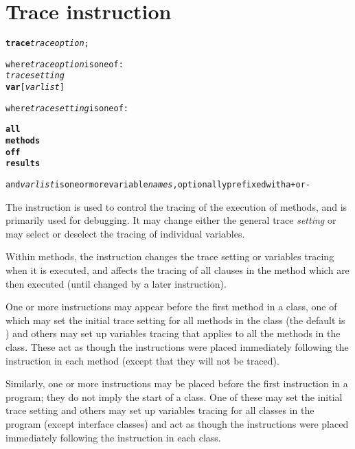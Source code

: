 \chapter{Trace instruction}\label{reftrace}
\index{,}
\index{,}
\begin{shaded}
\begin{alltt}
\textbf{trace} \emph{traceoption};

where \emph{traceoption} is one of:
    \emph{tracesetting}
    \textbf{var} [\emph{varlist}]

where \emph{tracesetting} is one of:

    \textbf{all}
    \textbf{methods}
    \textbf{off}
    \textbf{results}

and \emph{varlist} is one or more variable \emph{names}, optionally prefixed with a \texttt{+} or \texttt{-}
\end{alltt}
\end{shaded}
 The  instruction is used to control the tracing of the
execution of \nr{} methods, and is primarily used for debugging.
It may change either the general trace \emph{setting} or may select
or deselect the tracing of individual variables.
 
Within methods, the  instruction changes the trace setting
or variables tracing when it is executed, and affects the tracing of
all clauses in the method which are then executed (until changed by a
later  instruction).
 
One or more  instructions may appear before the first
method in a class, one of which may set the initial trace setting
for all methods in the class (the default is ) and others
may set up variables tracing that applies to all the methods in the
class.
These act as though the  instructions were
placed immediately following the  instruction in each
method (except that they will not be traced).
 
Similarly, one or more  instructions may be placed
before the first  instruction in a program; they do not
imply the start of a class.  One of these may set the initial trace
setting and others may set up variables tracing for all classes in
the program (except interface classes) and act as though the
 instructions were placed immediately following the
 instruction in each class.
